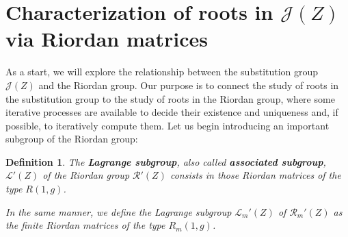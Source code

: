 \documentclass[preprint,12pt]{elsarticle}
\newtheorem{defi}{Definition}
\begin{document}








\section{Characterization of roots in \texorpdfstring{$\mathcal J(Z)$}{J(Z)} via Riordan matrices}\label{Section_JZRiordan}


As a start, we will explore the relationship between the substitution group $\mathcal J(Z)$ and the Riordan group. Our purpose is to connect the study of roots in the substitution group to the study of roots in the Riordan group, where some iterative processes are available to decide their existence and uniqueness and, if possible, to iteratively compute them. Let us begin introducing an important subgroup of the Riordan group:

\begin{defi}
The \textbf{Lagrange subgroup}, also called \textbf{associated subgroup}, $\mathcal L'(Z)$ of the Riordan group $\mathcal R'(Z)$ consists in those Riordan matrices of the type $R(1,g)$. 

 In the same manner, we define the Lagrange subgroup $\mathcal L_m'(Z)$ of  $\mathcal R_m'(Z)$ as the finite Riordan matrices of the type $R_m(1,g)$.
\end{defi}


\medskip
\end{document}
